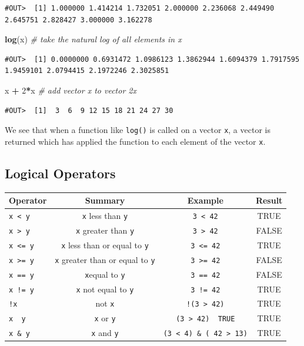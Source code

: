 \documentclass[]{book}
\newenvironment{Shaded}{\begin{snugshade}}{\end{snugshade}}
\newcommand{\CommentTok}[1]{\textcolor[rgb]{0.56,0.35,0.01}{\textit{#1}}}
\newcommand{\DecValTok}[1]{\textcolor[rgb]{0.00,0.00,0.81}{#1}}
\newcommand{\KeywordTok}[1]{\textcolor[rgb]{0.13,0.29,0.53}{\textbf{#1}}}
\newcommand{\NormalTok}[1]{#1}
\newcommand{\OperatorTok}[1]{\textcolor[rgb]{0.81,0.36,0.00}{\textbf{#1}}}
\newcommand{\StringTok}[1]{\textcolor[rgb]{0.31,0.60,0.02}{#1}}
\begin{document}
\begin{verbatim}
#OUT>  [1] 1.000000 1.414214 1.732051 2.000000 2.236068 2.449490 2.645751 2.828427 3.000000 3.162278
\end{verbatim}

\begin{Shaded}
\begin{Highlighting}[]
\KeywordTok{log}\NormalTok{(x)    }\CommentTok{# take the natural log of all elements in x}
\end{Highlighting}
\end{Shaded}

\begin{verbatim}
#OUT>  [1] 0.0000000 0.6931472 1.0986123 1.3862944 1.6094379 1.7917595 1.9459101 2.0794415 2.1972246 2.3025851
\end{verbatim}

\begin{Shaded}
\begin{Highlighting}[]
\NormalTok{x }\OperatorTok{+}\StringTok{ }\DecValTok{2}\OperatorTok{*}\NormalTok{x   }\CommentTok{# add vector x to vector 2x}
\end{Highlighting}
\end{Shaded}

\begin{verbatim}
#OUT>  [1]  3  6  9 12 15 18 21 24 27 30
\end{verbatim}

We see that when a function like \texttt{log()} is called on a vector \texttt{x}, a vector is returned which has applied the function to each element of the vector \texttt{x}.

\hypertarget{logical-operators}{%
\subsection{Logical Operators}\label{logical-operators}}

\begin{longtable}[]{@{}lccc@{}}
\toprule
Operator & Summary & Example & Result\tabularnewline
\midrule
\endhead
\texttt{x\ \textless{}\ y} & \texttt{x} less than \texttt{y} & \texttt{3\ \textless{}\ 42} & TRUE\tabularnewline
\texttt{x\ \textgreater{}\ y} & \texttt{x} greater than \texttt{y} & \texttt{3\ \textgreater{}\ 42} & FALSE\tabularnewline
\texttt{x\ \textless{}=\ y} & \texttt{x} less than or equal to \texttt{y} & \texttt{3\ \textless{}=\ 42} & TRUE\tabularnewline
\texttt{x\ \textgreater{}=\ y} & \texttt{x} greater than or equal to \texttt{y} & \texttt{3\ \textgreater{}=\ 42} & FALSE\tabularnewline
\texttt{x\ ==\ y} & \texttt{x}equal to \texttt{y} & \texttt{3\ ==\ 42} & FALSE\tabularnewline
\texttt{x\ !=\ y} & \texttt{x} not equal to \texttt{y} & \texttt{3\ !=\ 42} & TRUE\tabularnewline
\texttt{!x} & not \texttt{x} & \texttt{!(3\ \textgreater{}\ 42)} & TRUE\tabularnewline
\texttt{x\ \textbar{}\ y} & \texttt{x} or \texttt{y} & \texttt{(3\ \textgreater{}\ 42)\ \textbar{}\ TRUE} & TRUE\tabularnewline
\texttt{x\ \&\ y} & \texttt{x} and \texttt{y} & \texttt{(3\ \textless{}\ 4)\ \&\ (\ 42\ \textgreater{}\ 13)} & TRUE\tabularnewline
\bottomrule
\end{longtable}
\end{document}
